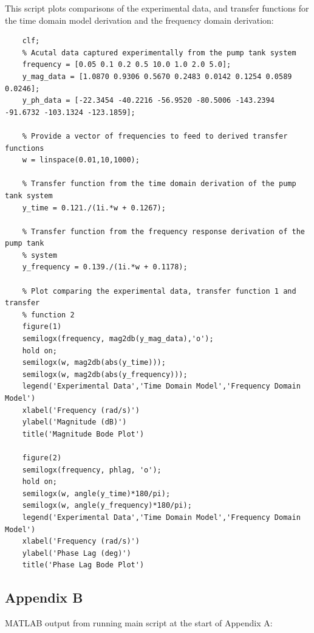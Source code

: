 \documentclass{article}
\begin{document}
\newpage
This script plots comparisons of the experimental data, and transfer functions for the time domain model derivation and the frequency domain derivation:
\begin{lstlisting}
	clf;
	% Acutal data captured experimentally from the pump tank system
	frequency = [0.05 0.1 0.2 0.5 10.0 1.0 2.0 5.0];
	y_mag_data = [1.0870 0.9306 0.5670 0.2483 0.0142 0.1254 0.0589 0.0246];
	y_ph_data = [-22.3454 -40.2216 -56.9520 -80.5006 -143.2394 -91.6732 -103.1324 -123.1859];
	
	% Provide a vector of frequencies to feed to derived transfer functions
	w = linspace(0.01,10,1000);
	
	% Transfer function from the time domain derivation of the pump tank system
	y_time = 0.121./(1i.*w + 0.1267);
	
	% Transfer function from the frequency response derivation of the pump tank
	% system
	y_frequency = 0.139./(1i.*w + 0.1178);
	
	% Plot comparing the experimental data, transfer function 1 and transfer
	% function 2
	figure(1)
	semilogx(frequency, mag2db(y_mag_data),'o');
	hold on;
	semilogx(w, mag2db(abs(y_time)));
	semilogx(w, mag2db(abs(y_frequency)));
	legend('Experimental Data','Time Domain Model','Frequency Domain Model')
	xlabel('Frequency (rad/s)')
	ylabel('Magnitude (dB)')
	title('Magnitude Bode Plot')
	
	figure(2)
	semilogx(frequency, phlag, 'o');
	hold on;
	semilogx(w, angle(y_time)*180/pi);
	semilogx(w, angle(y_frequency)*180/pi);
	legend('Experimental Data','Time Domain Model','Frequency Domain Model')
	xlabel('Frequency (rad/s)')
	ylabel('Phase Lag (deg)')
	title('Phase Lag Bode Plot')
\end{lstlisting}

\newpage
\subsection{Appendix B}
MATLAB output from running main script at the start of Appendix A:
\end{document}
